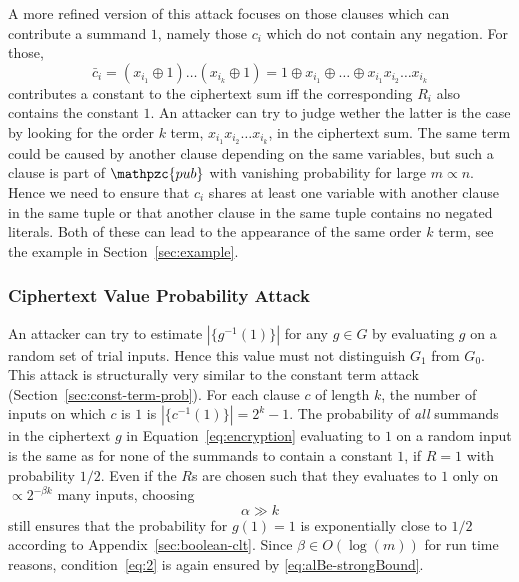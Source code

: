 \documentclass[final,journal,compsoc]{IEEEtran}
\newcommand{\pub}{\mathpzc{pub}}
\begin{document}
A more refined version of this attack focuses on those clauses which
can contribute a summand $1$, namely those $c_i$ which do not contain
any negation. For those, 
\begin{equation}
\bar c_i = (x_{i_1}\oplus1)\ldots(x_{i_k}\oplus
1) = 1 \oplus x_{i_1}\oplus \ldots \oplus x_{i_1}x_{i_2}\ldots x_{i_k}
\end{equation}
contributes a constant to the ciphertext sum iff the corresponding $R_i$
also contains the constant $1$.  An attacker can try to judge wether
the latter is the case by looking for the order $k$ term,
$x_{i_1}x_{i_2}\ldots x_{i_k}$, in the ciphertext sum.  The same term
could be caused by another clause depending on the same variables, but
such a clause is part of $\pub$ with vanishing probability for large
$m\propto n$. Hence we need to ensure that $c_i$ shares at least one
variable with another clause in the same tuple or that another clause
in the same tuple contains no negated literals. Both of these can lead
to the appearance of the same order $k$ term, see
the example in Section~\ref{sec:example}.


\subsubsection{Ciphertext Value Probability Attack\label{sec:ciph-value-prob}}

An attacker can try to estimate $|\{g^{-1}(1)\}|$ for any $g\in G$ by
evaluating $g$ on a random set of trial inputs. Hence this value must
not distinguish $G_1$ from $G_0$.  This attack is structurally very
similar to the constant term attack
(Section~\ref{sec:const-term-prob}). For each clause $c$ of length
$k$, the number of inputs on which $c$ is $1$ is $|\{c^{-1}(1)\}|=
2^{k}-1$. The probability of \emph{all} summands in the ciphertext $g$ in
Equation~\eqref{eq:encryption} evaluating to $1$ on a random input is
the same as for none of the summands to contain a constant $1$, if
$R=1$ with probability $1/2$.  Even if the $R$s are chosen
such that they evaluates to $1$ only on $\propto 2^{-\beta k}$ many
inputs, choosing
 \begin{equation}
\label{eq:2}
 \alpha \gg k 
 \end{equation}
still ensures that the probability for $g(1)=1$ is exponentially close
to $1/2$ according to Appendix~\ref{sec:boolean-clt}.
Since $\beta \in O(\log(m))$ for run time
 reasons, condition~\eqref{eq:2} is again ensured by \eqref{eq:alBe-strongBound}.
\end{document}
